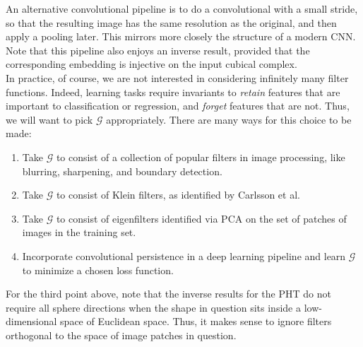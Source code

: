 \documentclass[conference]{IEEEtran}
\theoremstyle{definition}
\numberwithin{figure}{section}
\begin{document}
An alternative convolutional pipeline is to do a convolutional with a small stride, so that the resulting image has the same resolution as the original, and then apply a pooling later. This mirrors more closely the structure of a modern CNN. Note that this pipeline also enjoys an inverse result, provided that the corresponding embedding is injective on the input cubical complex.\\

In practice, of course, we are not interested in considering infinitely many filter functions. Indeed, learning tasks require invariants to \emph{retain} features that are important to classification or regression, and \emph{forget} features that are not. Thus, we will want to pick $\mathcal{G}$ appropriately. There are many ways for this choice to be made:
\begin{enumerate}
	\item Take $\mathcal{G}$ to consist of a collection of popular filters in image processing, like blurring, sharpening, and boundary detection.
	\item Take $\mathcal{G}$ to consist of Klein filters, as identified by Carlsson et al.
	\item Take $\mathcal{G}$ to consist of eigenfilters identified via PCA on the set of patches of images in the training set.
	\item Incorporate convolutional persistence in a deep learning pipeline and learn $\mathcal{G}$ to minimize a chosen loss function.
\end{enumerate}

For the third point above, note that the inverse results for the PHT do not require all sphere directions when the shape in question sits inside a low-dimensional space of Euclidean space. Thus, it makes sense to ignore filters orthogonal to the space of image patches in question.\\

 
\end{document}
